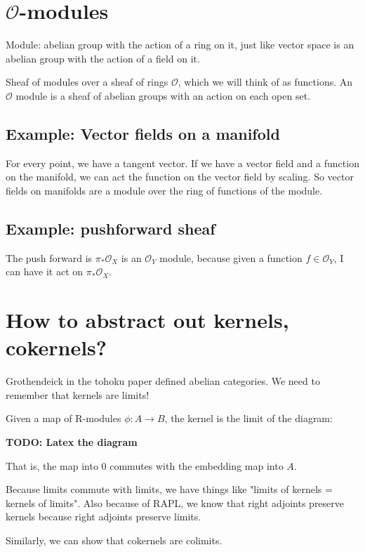 \documentclass{book}
\renewcommand{\O}{\ensuremath{\mathcal{O}}}
\theoremstyle{definition}
\begin{document}
\section{$\O$-modules}
Module: abelian group with the action of a ring on it, just like vector space
is an abelian group with the action of a field on it.


Sheaf of modules over a sheaf of rings $\O$, which we will think of
as functions. An $\O$ module is a sheaf of abelian groups 
with an action on each open set.

\subsection{Example: Vector fields on a manifold}
For every point, we have a tangent vector. If we have a vector field and a
function on the manifold, we can act the function on the vector field by scaling.
So vector fields on manifolds are a module over the ring of functions of the module.

\subsection{Example: pushforward sheaf}
The push forward is $\pi_* \O_X$ is an $\O_Y$ module, because
given a function $f \in \O_Y$, I can have it act on $\pi_* \O_X$.

\section{How to abstract out kernels, cokernels?}
Grothendeick in the tohoku paper defined abelian categories. We need to remember
that kernels are limits!

Given a map of R-modules $\phi: A \rightarrow B$, the kernel is the limit of
the diagram:


\textbf{TODO: Latex the diagram}

That is, the map into $0$ commutes with the embedding map into $A$. 

Because limits commute with limits, we have things like "limits of kernels = kernels of limits".
Also because of RAPL, we know that right adjoints preserve kernels because
right adjoints preserve limits.

Similarly, we can show that cokernels are colimits.
\end{document}
